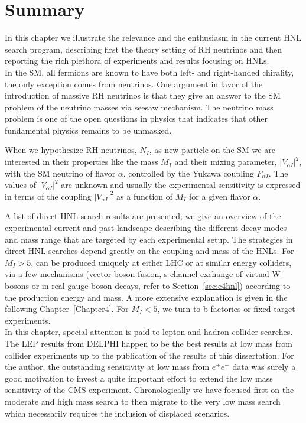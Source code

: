 \section{Summary}
In this chapter we illustrate the relevance and the enthusiasm in the
current HNL search program, describing first the theory setting of RH
neutrinos and then reporting the rich plethora of experiments and results
focusing on HNLs.\\
In the SM, all fermions are known to have both
left- and right-handed chirality, the only exception comes from 
neutrinos. One argument in favor of the introduction of massive RH
neutrinos is that they give an answer to the SM problem of the
neutrino masses via seesaw mechanism. The neutrino mass
problem is one of the open questions in physics that indicates that
other fundamental physics remains to be unmasked.

When we hypothesize RH neutrinos, $N_{I}$, as new particle on the SM we
are interested in their properties like the mass $M_I$ and
their mixing parameter, $|V_{\alpha I}|^2$,  with the SM neutrino of flavor $\alpha$,
controlled by the Yukawa coupling $F_{\alpha I}$. The values of
$|V_{\alpha I}|^2$ are unknown and usually the experimental
sensitivity is expressed in terms of the coupling $|V_{\alpha I}|^2$
as a function of $M_I$ for a given flavor
$\alpha$.

A list of direct HNL search results are presented; we give an overview
of the experimental current and past landscape describing the different decay modes and
mass range that are targeted by each experimental setup.
The strategies in direct HNL searches depend greatly on the coupling
and mass of the HNLs. For $M_{I} > 5$\GeV, \hnl can be
produced uniquely at either LHC or at similar energy colliders, via a few
mechanisms (vector boson fusion, s-channel exchange of virtual
W-bosons or in real gauge boson decays, refer to Section~\ref{sec:c4hnl}) according to the production
energy and \hnl mass. A more extensive explanation is given in the following
Chapter~\ref{Chapter4}. For $M_{I} < 5$\GeV, we turn to b-factories
or fixed target experiments. \\
In this chapter, special attention is paid to lepton and hadron collider
searches. The LEP results from DELPHI happen to be the best results at
low mass from collider experiments up to the publication of the results
of this dissertation. For the author, the outstanding sensitivity at low mass from
$e^{+}e^{-}$ data was surely a good motivation to invest a quite
important effort to extend the low mass sensitivity of
the CMS experiment. Chronologically we have focused first on the
moderate and high mass search to then migrate to the very low mass search which
necessarily requires the inclusion of displaced scenarios.

